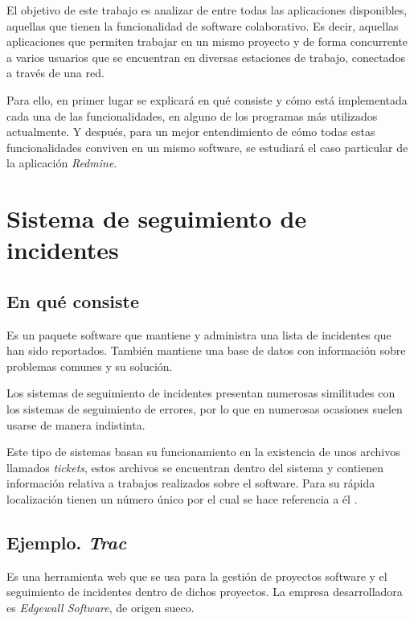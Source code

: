 \documentclass[11pt,a4paper,spanish,twoside]{report}
\begin{document}
El objetivo de este trabajo es analizar de entre todas las aplicaciones
disponibles, aquellas que tienen la funcionalidad de software colaborativo.
Es decir, aquellas aplicaciones que permiten trabajar en un mismo proyecto y
de forma concurrente a varios usuarios que se encuentran en diversas
estaciones de trabajo, conectados a través de una red.

Para ello, en primer lugar se explicará en qué consiste y cómo está
implementada cada una de las funcionalidades, en alguno de los programas más
utilizados actualmente. Y después, para un mejor entendimiento de cómo todas
estas funcionalidades conviven en un mismo software, se estudiará el caso
particular de la aplicación \emph{Redmine}.

\chapter{Sistema de seguimiento de incidentes}
\section{En qué consiste}
Es un paquete software que mantiene y administra una lista de incidentes que
han sido reportados. También mantiene una base de datos con información sobre
problemas comunes y su solución.

Los sistemas de seguimiento de incidentes presentan numerosas similitudes con
los sistemas de seguimiento de errores, por lo que en numerosas ocasiones
suelen usarse de manera indistinta.

Este tipo de sistemas basan su funcionamiento en la existencia de unos
archivos llamados \emph{tickets}, estos archivos se encuentran dentro del
sistema y contienen información relativa a trabajos realizados sobre el
software. Para su rápida localización tienen un número único por el cual se
hace referencia a él \cite{ITS}.

\section{Ejemplo. \emph{Trac}}
Es una herramienta web que se usa para la gestión de proyectos software y el
seguimiento de incidentes dentro de dichos proyectos. La empresa
desarrolladora es \emph{Edgewall Software}, de origen sueco. \cite{TRA}
\end{document}
